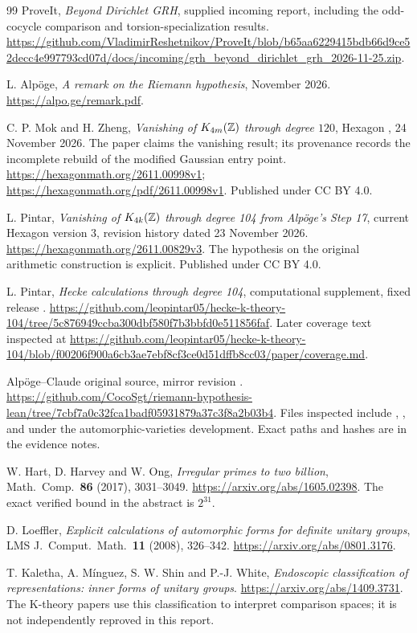 \begin{thebibliography}{99}
ProveIt, \emph{Beyond Dirichlet GRH}, supplied incoming report,
including the odd-cocycle comparison and torsion-specialization results.
\url{https://github.com/VladimirReshetnikov/ProveIt/blob/b65aa6229415bdb66d9ce52decc4e997793cd07d/docs/incoming/grh_beyond_dirichlet_grh_2026-11-25.zip}.

L. Alp\"oge, \emph{A remark on the Riemann hypothesis}, November 2026.
\url{https://alpo.ge/remark.pdf}.

C. P. Mok and H. Zheng, \emph{Vanishing of $K_{4m}(\mathbb Z)$ through
degree $120$}, Hexagon , 24 November 2026.
The paper claims the vanishing result; its provenance records the
incomplete rebuild of the modified Gaussian entry point.
\url{https://hexagonmath.org/2611.00998v1};
\url{https://hexagonmath.org/pdf/2611.00998v1}.
Published under CC BY 4.0.

L. Pintar, \emph{Vanishing of $K_{4k}(\mathbb Z)$ through degree 104
from Alp\"oge's Step 17}, current Hexagon version 3, revision history
dated 23 November 2026.
\url{https://hexagonmath.org/2611.00829v3}.
The hypothesis on the original arithmetic construction is explicit.
Published under CC BY 4.0.

L. Pintar, \emph{Hecke calculations through degree 104},
computational supplement, fixed release .
\url{https://github.com/leopintar05/hecke-k-theory-104/tree/5c876949ccba300dbf580f7b3bbfd0e511856faf}.
Later coverage text inspected at
\url{https://github.com/leopintar05/hecke-k-theory-104/blob/f00206f900a6cb3ae7ebf8cf3ce0d51dffb8cc03/paper/coverage.md}.

Alp\"oge--Claude original source, mirror revision
.
\url{https://github.com/CocoSgt/riemann-hypothesis-lean/tree/7cbf7a0c32fca1badf05931879a37c3f8a2b03b4}.
Files inspected include ,
, and
 under the automorphic-varieties
development. Exact paths and hashes are in the evidence notes.

W. Hart, D. Harvey and W. Ong, \emph{Irregular primes to two billion},
Math.\ Comp.\ \textbf{86} (2017), 3031--3049.
\url{https://arxiv.org/abs/1605.02398}.
The exact verified bound in the abstract is $2^{31}$.

D. Loeffler, \emph{Explicit calculations of automorphic forms for
definite unitary groups}, LMS J.\ Comput.\ Math.\ \textbf{11} (2008),
326--342.
\url{https://arxiv.org/abs/0801.3176}.

T. Kaletha, A. M\'inguez, S. W. Shin and P.-J. White,
\emph{Endoscopic classification of representations: inner forms of
unitary groups}.
\url{https://arxiv.org/abs/1409.3731}.
The K-theory papers use this classification to interpret comparison
spaces; it is not independently reproved in this report.
\end{thebibliography}
